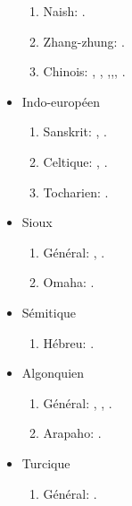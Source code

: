 \documentclass[oneside,a4paper,11pt]{article}
\newcommand{\langue}[2]{#2}
\begin{document}
\begin{itemize}
\begin{enumerate}
\item Naish: \citet{jacques.michaud11naish}.
\item  Zhang-zhung: \citet{jacques09zz}.
\item \langue{Chinese}{Chinois}:  \citet{jacques00ywij},  \citet{jacques03dissimilation},   \citet{jacques14honey},\citet{jacques15sr},\citet{jacques17genetic}, \citet{jacques17traditional}.
\end{enumerate}
\item \langue{Indo-European}{Indo-européen}
\begin{enumerate}
\item Sanskrit: \citet{jacques13vama}, \citet{jacques16camara}.
\item \langue{Celtic}{Celtique}: \citet{michaud-jacques12nasalite}, \citet{jacques15cochon}.
\item \langue{Tokharian}{Tocharien}: \citet{jacques14honey}.
\end{enumerate}
\item \langue{Siouan}{Sioux}
\begin{enumerate}
\item \langue{General}{Général}: \citet{jacques12bear},      \citet{michaud-jacques12nasalite}.  
\item Omaha: \citet{jacques16ebde}.
\end{enumerate}
\item \langue{Semitic}{Sémitique}
\begin{enumerate}
\item \langue{Hebrew}{Hébreu}: \citet{rg-gj12yod}.
\end{enumerate}
\item \langue{Algonquian}{Algonquien}
\begin{enumerate}
\item \langue{General}{Général}: \citet{jacques12bear}, \citet{jacques14inverse}, \citet{jacques17directionality}.
\item Arapaho: \citet{jacques13arapaho}.
\end{enumerate}
\item  \langue{Turkic}{Turcique}
\begin{enumerate}
\item  \langue{General}{Général}: \citet{antonov12kumush}.
\end{enumerate}
\end{itemize} 
 
\end{document}
